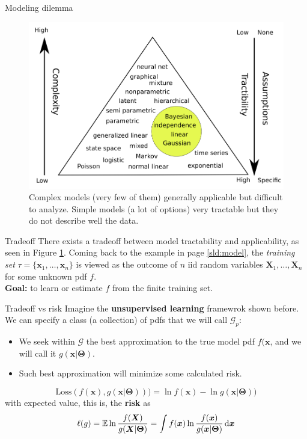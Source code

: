 \documentclass{beamer}
\begin{document}
\begin{frame}{Modeling dilemma}
  \begin{figure}
    \includegraphics[width=0.7\linewidth]{dilemma}
    \caption{Complex models (very few of them) generally applicable but difficult to analyze. Simple models (a lot of options) very tractable but they do not describe well the data\cite{kroese2020}.}
    \label{fig:dilemma}
  \end{figure}
\end{frame}

\begin{frame}{Tradeoff}
  There exists a tradeoff between model tractability and applicability, as seen in Figure \ref{fig:dilemma}. Coming back to the example in page \ref{sld:model}, the {\em training set} $\tau = \{\bm{x}_1,\ldots,\bm{x}_n\}$ is viewed as the outcome of $n$ iid random variables $\bm{X}_1,\ldots,\bm{X}_n$ for some unknown pdf $f$.\\[2ex]

  {\bf Goal:} to learn or estimate $f$ from the finite training set.
\end{frame}

\begin{frame}{Tradeoff vs risk}
  Imagine the {\bf unsupervised learning} framewrok shown before. We can specify a class (a collection) of pdfs  that we will call $\mathcal{G}_p$:
  \begin{itemize}
    \item We seek within $\mathcal{G}$ the best approximation to the true model pdf $f(\bm{x}$, and we will call it $g(\bm{x}|\bm{\Theta})$. 
    \item Such best approximation will minimize some calculated risk.
  \end{itemize}
  \[
    \mathrm{Loss}(f(\bm{x}),g(\bm{x}|\bm{\Theta})))=\ln f(\bm{x}) - \ln g(\bm{x}|\bm{\Theta}))
    \]
    with expected value, this is, the {\bf risk} as
    \[
    \ell(g)= \mathbb{E}  \ln \frac{f(\bm{X})}{g(\bm{X}|\bm{\Theta})} = \int f(\bm{x}) \ln \frac{f(\bm{x})}{g(\bm{x}|\bm{\Theta})} \mathop{}\!\mathrm{d} \bm{x}
    \]
\end{frame}
\end{document}
